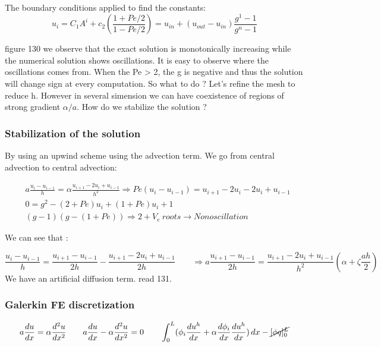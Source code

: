 The boundary conditions applied to find the constants: 
\begin{equation}
u_i = C_1 A^i + c_2 \left(\frac{1+Pe/2}{1-Pe/2} \right) = u_{in} + (u_{out}-u_{in})\frac{g^1 -1 }{g^n -1}
\end{equation}

figure 130 we observe that the exact solution is monotonically increasing while the numerical solution shows oscillations. It is easy to observe where the oscillations comes from. When the Pe > 2, the g is negative and thus the solution will change sign at every computation. So what to do ? Let's refine the mesh to reduce h. However in several simension we can have coexistence of regions of strong gradient $\alpha / a$. How do we stabilize the solution ? 

\subsubsection{Stabilization of the solution}
By using an upwind scheme using the advection term. We go from central advection to central advection: 

\begin{equation}
\begin{aligned}
&a \frac{u_i - u_{i-1}}{h} = \alpha \frac{u_{i+1}-2u_i + u_{i-1}}{h^2} \Rightarrow Pe  (u_i - u_{i-1}) = u_{i+1}-2u_i - 2u_i + u_{i-1}\\
&0 = g^2 - (2 + Pe) u_i +(1+Pe) u_i + 1\\
&(g-1)(g-(1+Pe)) \Rightarrow 2 + V_e \ roots \rightarrow Non oscillation
\end{aligned}
\end{equation}

We can see that :

\begin{equation}
\frac{u_i - u_{i-1}}{h} = \frac{u_{i+1}-u_{i-1}}{2h} - \frac{u_{i+1}-2u_i +u_{i-1}}{2h} \qquad \Rightarrow a \frac{u_{i+1}-u_{i-1}}{2h} = \frac{u_{i+1}-2u_i+  u_{i-1}}{h^2}(\alpha + \zeta \frac{ah}{2})
\end{equation}
We have an artificial diffusion term. 
read 131. 

\subsubsection{Galerkin FE discretization}
\begin{equation}
a\frac{du}{dx}= \alpha \frac{d^2u}{dx^2} \qquad a\frac{du}{dx} - \alpha \frac{d^2u}{dx^2} = 0 \qquad \int _0^L (\phi _i \frac{du^h}{dx}+ \alpha \frac{d\phi _i}{dx}\frac{du^h}{dx})\, dx - \cancel{[\phi q]_0^L }
\end{equation}

